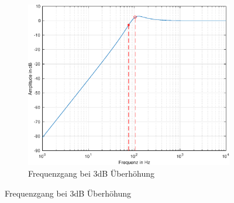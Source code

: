 \begin{figure}[bth]
    \begin{subfigure}{.5\textwidth}
        \centering
        \includegraphics[width=0.85\linewidth]{Figures/Frequenzgang_3dB.eps}
        \caption{Frequenzgang bei 3dB Überhöhung}
        \label{Frequenzgang_3dB}
    \end{subfigure}
\end{figure}